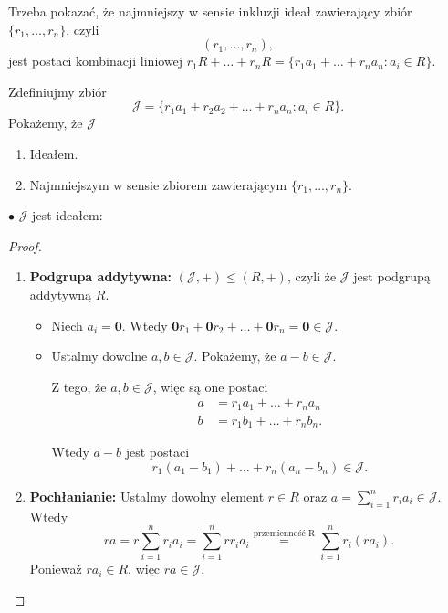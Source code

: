 \begin{solution}
	Trzeba pokazać, że najmniejszy w sensie inkluzji ideał zawierający zbiór $\{r_1,\ldots,r_{n}\}$, czyli \[
		\left( r_1,\ldots,r_{n} \right) 
	,\]  	
	jest postaci kombinacji liniowej $r_1R + \ldots + r_{n}R = \{r_1a_1 + \ldots + r_{n}a_{n} : a_{i}\in R\} $.

	Zdefiniujmy zbiór 
	\[
	\mathcal{J} = \{r_1a_1+ r_2a_2 + \ldots + r_{n}a_{n} : a_{i}\in R\} 
	.\] 
	Pokażemy, że $\mathcal{J}$
	\begin{enumerate}[label=\alph*)]
		\item Ideałem.
		\item Najmniejszym w sensie zbiorem zawierającym $\{r_1,\ldots,r_{n}\} $.
	\end{enumerate}
	\noindent $\bullet$ $\mathcal{J}$ jest ideałem:
	\begin{proof}

		\vspace{1pt}
		
		\begin{enumerate}[label=\arabic*)]
			\item \textbf{Podgrupa addytywna:} $\left( \mathcal{J}, + \right) \le \left( R, + \right) $, czyli że $\mathcal{J}$ jest podgrupą addytywną $R$.
				\begin{itemize}
					\item Niech $a_{i} = \mathbf{0}$. Wtedy $\mathbf{0}r_1 + \mathbf{0}r_2 + \ldots + \mathbf{0}r_{n} = \mathbf{0} \in \mathcal{J}$.
					\item Ustalmy dowolne $a,b \in \mathcal{J}$. Pokażemy, że $a-b \in \mathcal{J}$.

						Z tego, że  $a,b \in \mathcal{J}$, więc są one postaci
						\begin{align*}
							a &= r_1a_1 + \ldots + r_{n}a_{n}  \\
							b &= r_1b_1 + \ldots + r_{n}b_{n} 
						.\end{align*}

						Wtedy $a-b$ jest postaci
						\[
						r_1\left( a_1-b_1 \right) + \ldots + r_{n}\left( a_{n} -b_{n}  \right) \in \mathcal{J}
						.\] 
				\end{itemize}
			\item \textbf{Pochłanianie:} Ustalmy dowolny element $r \in R$ oraz $a = \sum_{i=1}^{n} r_{i}a_{i} \in  \mathcal{J}$. Wtedy 
				\[
				ra = r\sum_{i=1}^{n} r_{i}a_{i} = \sum_{i=1}^{n} rr_{i}a_{i} \overset{\text{przemienność R}}{=} \sum_{i=1}^{n} r_{i}\left( ra_{i} \right) 
				.\] 
				Ponieważ $ra_{i} \in R$, więc $ra \in \mathcal{J}$.
		\end{enumerate}


\end{proof}
\end{solution}
